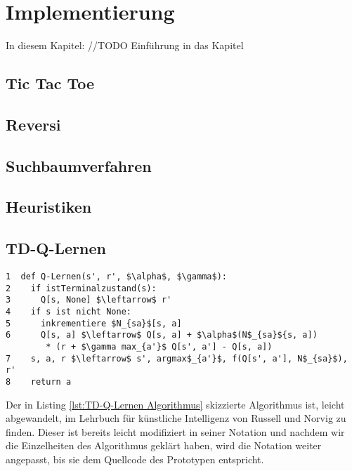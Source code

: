 \chapter{Implementierung}
\label{cha:Implementierung}

In diesem Kapitel: //TODO Einführung in das Kapitel

\section{Tic Tac Toe}

\section{Reversi}

\section{Suchbaumverfahren}

\section{Heuristiken}

\section{TD-Q-Lernen}

\begin{lstlisting}[caption=TD-Q-Lernen Algorithmus, label=lst:TD-Q-Lernen Algorithmus, frame=single, mathescape=true]
1  def Q-Lernen(s', r', $\alpha$, $\gamma$):
2    if istTerminalzustand(s):
3      Q[s, None] $\leftarrow$ r'
4    if s ist nicht None:
5      inkrementiere $N_{sa}$[s, a]
6      Q[s, a] $\leftarrow$ Q[s, a] + $\alpha$(N$_{sa}${s, a])
  		* (r + $\gamma max_{a'}$ Q[s', a'] - Q[s, a])
7    s, a, r $\leftarrow$ s', argmax$_{a'}$, f(Q[s', a'], N$_{sa}$), r'
8    return a
\end{lstlisting}

Der in Listing \ref{lst:TD-Q-Lernen Algorithmus} skizzierte Algorithmus ist, leicht abgewandelt, im Lehrbuch für künstliche Intelligenz von Russell und Norvig \cite[974]{Russell} zu finden. Dieser ist bereits leicht modifiziert in seiner Notation und nachdem wir die Einzelheiten des Algorithmus geklärt haben, wird die Notation weiter angepasst, bis sie dem Quellcode des Prototypen entspricht. \\

